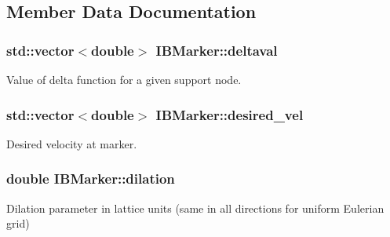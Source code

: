 \subsection{Member Data Documentation}
\subsubsection[{\texorpdfstring{deltaval}{deltaval}}]{\setlength{\rightskip}{0pt plus 5cm}std\+::vector$<$double$>$ I\+B\+Marker\+::deltaval\hspace{0.3cm}{\ttfamily [protected]}}\hypertarget{class_i_b_marker_a82296e15048c55bd121245d85b076168}{}\label{class_i_b_marker_a82296e15048c55bd121245d85b076168}


Value of delta function for a given support node. 

\subsubsection[{\texorpdfstring{desired\+\_\+vel}{desired_vel}}]{\setlength{\rightskip}{0pt plus 5cm}std\+::vector$<$double$>$ I\+B\+Marker\+::desired\+\_\+vel\hspace{0.3cm}{\ttfamily [protected]}}\hypertarget{class_i_b_marker_ad9535b494684533ace9a9523c4df26bf}{}\label{class_i_b_marker_ad9535b494684533ace9a9523c4df26bf}


Desired velocity at marker. 

\subsubsection[{\texorpdfstring{dilation}{dilation}}]{\setlength{\rightskip}{0pt plus 5cm}double I\+B\+Marker\+::dilation\hspace{0.3cm}{\ttfamily [protected]}}\hypertarget{class_i_b_marker_a5c908a7e52fc0b2dccbaa277f37b7c22}{}\label{class_i_b_marker_a5c908a7e52fc0b2dccbaa277f37b7c22}


Dilation parameter in lattice units (same in all directions for uniform Eulerian grid) 

